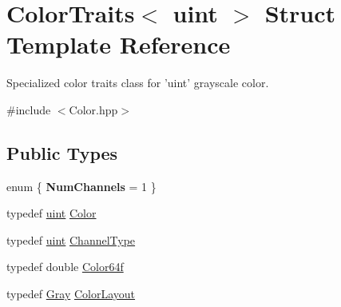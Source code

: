\hypertarget{struct_d_o_1_1_color_traits_3_01uint_01_4}{\section{Color\-Traits$<$ uint $>$ Struct Template Reference}
\label{struct_d_o_1_1_color_traits_3_01uint_01_4}
}


Specialized color traits class for 'uint' grayscale color.  




{\ttfamily \#include $<$Color.\-hpp$>$}

\subsection*{Public Types}
\begin{DoxyCompactItemize}
\item 
enum \{ {\bfseries Num\-Channels} = 1
 \}
\item 
typedef \hyperlink{group___eigen_typedefs_ga91ad9478d81a7aaf2593e8d9c3d06a14}{uint} \hyperlink{struct_d_o_1_1_color_traits_3_01uint_01_4_a8b2c4dc7fbdc5063366a0c52d63b0d0b}{Color}
\item 
typedef \hyperlink{group___eigen_typedefs_ga91ad9478d81a7aaf2593e8d9c3d06a14}{uint} \hyperlink{struct_d_o_1_1_color_traits_3_01uint_01_4_a13416f6d181e4a56a2ca17183638098f}{Channel\-Type}
\item 
typedef double \hyperlink{struct_d_o_1_1_color_traits_3_01uint_01_4_a9a301fd8ba0a7225e38351d3e5b2e4d3}{Color64f}
\item 
typedef \hyperlink{struct_d_o_1_1_gray}{Gray} \hyperlink{struct_d_o_1_1_color_traits_3_01uint_01_4_a7c9d599cfa0d1404784fbe60e6bcfd24}{Color\-Layout}
\end{DoxyCompactItemize}
